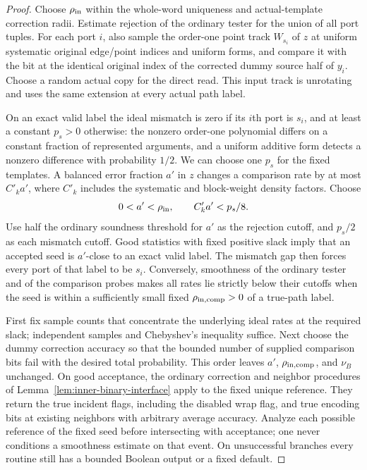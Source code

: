 \begin{proof}
Choose $\rho_{\rm in}$ within the whole-word uniqueness and actual-template
correction radii. Estimate rejection of the ordinary tester for the union
of all port tuples. For each port $i$, also sample the order-one point
track $W_{s_i}$ of $z$ at uniform systematic original edge/point indices
and uniform forms, and compare it with the bit at the identical original
index of the corrected dummy source half of $y_i$. Choose a random actual
copy for the direct read. This input track is unrotating and uses the
same extension at every actual path label.

On an exact valid label the ideal mismatch is zero if its $i$th port is
$s_i$, and at least a constant $p_s>0$ otherwise: the nonzero order-one
polynomial differs on a constant fraction of represented arguments, and
a uniform additive form detects a nonzero difference with probability
$1/2$. We can choose one $p_s$ for the fixed templates. A balanced error
fraction $a'$ in $z$ changes a comparison rate by at most $C'_k a'$,
where $C'_k$ includes the systematic and block-weight density factors.
Choose
\[
 0<a'<\rho_{\rm in},\qquad C'_k a'<p_s/8.
\]
Use half the ordinary soundness threshold for $a'$ as the rejection
cutoff, and $p_s/2$ as each mismatch cutoff. Good statistics with fixed
positive slack imply that an accepted seed is $a'$-close to an exact
valid label. The mismatch gap then forces every port of that label to
be $s_i$. Conversely, smoothness of the ordinary tester and of the
comparison probes makes all rates lie strictly below their cutoffs when
the seed is within a sufficiently small fixed
$\rho_{\rm in,comp}>0$ of a true-path label.

First fix sample counts that concentrate the underlying ideal rates at
the required slack; independent samples and Chebyshev's inequality
suffice. Next choose the dummy correction accuracy so that the bounded
number of supplied comparison bits fail with the desired total
probability. This order leaves $a'$, $\rho_{\rm in,comp}$, and $\nu_B$
unchanged. On good acceptance, the ordinary correction and neighbor
procedures of Lemma~\ref{lem:inner-binary-interface} apply to the fixed
unique reference. They return the true incident flags, including the
disabled wrap flag, and true encoding bits at existing neighbors with
arbitrary average accuracy. Analyze each possible reference of the fixed
seed before intersecting with acceptance; one never conditions a
smoothness estimate on that event. On unsuccessful branches every routine
still has a bounded Boolean output or a fixed default.
\end{proof}

